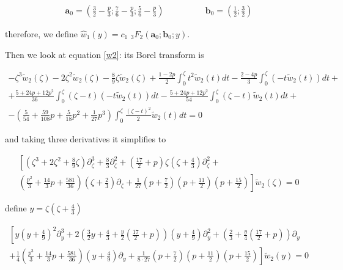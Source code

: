 \documentclass{article}
\begin{document}
\begin{align*}
\mathbf{a}_0=\left(\frac{3}{2}-\frac{p}{3};\frac{7}{6}-\frac{p}{3};\frac{5}{6}-\frac{p}{3}\right) & \qquad\qquad \mathbf{b}_0=\left(\frac{1}{2};\frac{3}{2}\right)
\end{align*}

therefore, we define $\hat{w}_1(y)=c_1\,\,{}_3F_2\left(\mathbf{a}_0;\mathbf{b}_0;y\right)$. 

Then we look at equation \eqref{w2}: its Borel transform is

\begin{multline}
-\zeta^3\tilde{w}_2(\zeta)-2\zeta^2\tilde{w}_2(\zeta)-\frac{8}{9}\zeta\tilde{w}_2(\zeta)+\frac{1-2p}{2}\int_0^\zeta t^2\tilde{w}_2(t)dt-\frac{2-4p}{3}\int_0^\zeta(-t\tilde{w}_2(t))dt+\\
+\frac{5+24p+12p^2}{36}\int_0^\zeta(\zeta-t)(-t\tilde{w}_2(t))dt
-\frac{5+24p+12p^2}{54}\int_0^\zeta(\zeta-t)\tilde{w}_2(t)dt +\\
-\left(\frac{5}{54}+\frac{59}{108}p+\frac{5}{18}p^2+\frac{1}{27}p^3\right)\int_0^\zeta\frac{(\zeta-t)^2}{2}\tilde{w}_2(t)dt=0
\end{multline} 

and taking three derivatives it simplifies to 

\begin{multline}
\left[\left(\zeta^3+2\zeta^2+\frac{8}{9}\zeta\right)\partial_\zeta^3 +\frac{8}{3}\partial_\zeta^2+\left(\frac{17}{2}+p\right)\zeta\left(\zeta+\frac{4}{3}\right)\partial_\zeta^2+\right.\\
\left. \left(\frac{p^2}{3}+\frac{14}{3}p+\frac{581}{36}\right)\left(\zeta+\frac{2}{3}\right)\partial_\zeta+\frac{1}{27}\left(p+\frac{7}{2}\right)\left(p+\frac{11}{2}\right)\left(p+\frac{15}{2}\right)\right]\tilde{w}_2(\zeta)=0
\end{multline}

define $y=\zeta\left(\zeta+\frac{4}{3}\right)$

\begin{multline}\label{eq1}
\left[y\left(y+\frac{4}{9}\right)^2\partial_y^3+2\left(\frac{3}{2}y+\frac{4}{3}+\frac{y}{2}\left(\frac{17}{2}+p\right)\right)\left(y+\frac{4}{9}\right)\partial_y^2+\left(\frac{2}{3}+\frac{y}{4}\left(\frac{17}{2}+p\right)\right)\partial_y\right.\\
\left.+\frac{1}{4}\left(\frac{p^3}{3}+\frac{14}{3}p+\frac{581}{36}\right)\left(y+\frac{4}{9}\right)\partial_y+\frac{1}{8\cdot 27}\left(p+\frac{7}{2}\right)\left(p+\frac{11}{2}\right)\left(p+\frac{15}{2}\right)\right]\tilde{w}_2(y)=0
\end{multline}
\end{document}
